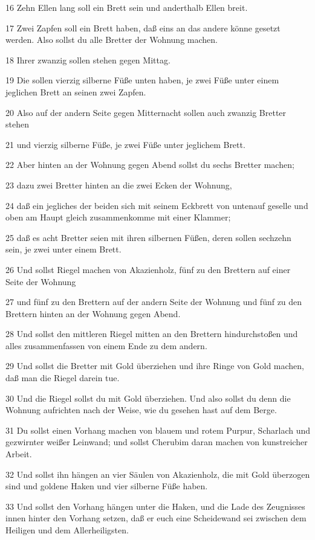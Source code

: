 \par 16 Zehn Ellen lang soll ein Brett sein und anderthalb Ellen breit.
\par 17 Zwei Zapfen soll ein Brett haben, daß eins an das andere könne gesetzt werden. Also sollst du alle Bretter der Wohnung machen.
\par 18 Ihrer zwanzig sollen stehen gegen Mittag.
\par 19 Die sollen vierzig silberne Füße unten haben, je zwei Füße unter einem jeglichen Brett an seinen zwei Zapfen.
\par 20 Also auf der andern Seite gegen Mitternacht sollen auch zwanzig Bretter stehen
\par 21 und vierzig silberne Füße, je zwei Füße unter jeglichem Brett.
\par 22 Aber hinten an der Wohnung gegen Abend sollst du sechs Bretter machen;
\par 23 dazu zwei Bretter hinten an die zwei Ecken der Wohnung,
\par 24 daß ein jegliches der beiden sich mit seinem Eckbrett von untenauf geselle und oben am Haupt gleich zusammenkomme mit einer Klammer;
\par 25 daß es acht Bretter seien mit ihren silbernen Füßen, deren sollen sechzehn sein, je zwei unter einem Brett.
\par 26 Und sollst Riegel machen von Akazienholz, fünf zu den Brettern auf einer Seite der Wohnung
\par 27 und fünf zu den Brettern auf der andern Seite der Wohnung und fünf zu den Brettern hinten an der Wohnung gegen Abend.
\par 28 Und sollst den mittleren Riegel mitten an den Brettern hindurchstoßen und alles zusammenfassen von einem Ende zu dem andern.
\par 29 Und sollst die Bretter mit Gold überziehen und ihre Ringe von Gold machen, daß man die Riegel darein tue.
\par 30 Und die Riegel sollst du mit Gold überziehen. Und also sollst du denn die Wohnung aufrichten nach der Weise, wie du gesehen hast auf dem Berge.
\par 31 Du sollst einen Vorhang machen von blauem und rotem Purpur, Scharlach und gezwirnter weißer Leinwand; und sollst Cherubim daran machen von kunstreicher Arbeit.
\par 32 Und sollst ihn hängen an vier Säulen von Akazienholz, die mit Gold überzogen sind und goldene Haken und vier silberne Füße haben.
\par 33 Und sollst den Vorhang hängen unter die Haken, und die Lade des Zeugnisses innen hinter den Vorhang setzen, daß er euch eine Scheidewand sei zwischen dem Heiligen und dem Allerheiligsten.

